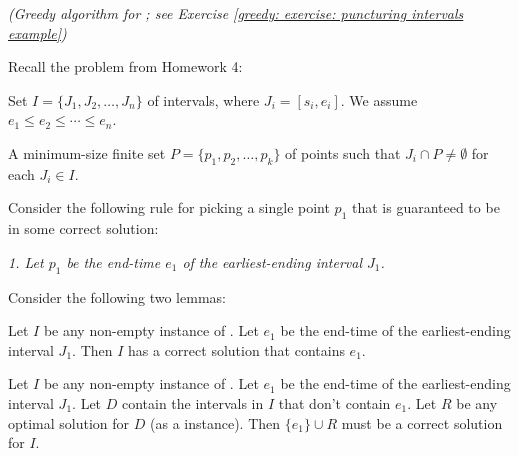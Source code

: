 \documentclass[11pt]{article}
\begin{document}






\newpage
\problem \emph{(Greedy algorithm for ; see Exercise \ref{greedy: exercise: puncturing intervals example})}

  Recall the  problem from Homework 4: 

  \begin{mylist}
  \item[\bf input:] Set $I=\{J_1, J_2, \ldots, J_n\}$ of intervals, where $J_i = [s_i, e_i]$.
    We assume $e_1 \le e_2 \le \cdots \le e_n$.
  \item[\bf output:] A minimum-size finite set $P=\{p_1, p_2, \ldots, p_k\}$
    of points such that $J_i \cap P \ne \emptyset$ for each $J_i\in I$.
  \end{mylist}

  Consider the following rule for picking a single point $p_1$ that is guaranteed to be in some
  correct solution:

  \smallskip 

  \emph{1. Let $p_1$ be the end-time $e_1$ of the earliest-ending interval $J_1$.}

  \smallskip

  Consider the following two lemmas:

  \begin{lemma}\label{lemma: pi greedy choice}
    Let $I$ be any non-empty instance of .
    Let $e_1$ be the end-time of the earliest-ending interval $J_1$.
    Then $I$ has a correct solution that contains $e_1$.
  \end{lemma}

  \begin{lemma}\label{lemma: pi recurse}
    Let $I$ be any non-empty instance of .
    Let $e_1$ be the end-time of the earliest-ending interval $J_1$.
    Let $D$ contain the intervals in $I$ that don't contain $e_1$.
    Let $R$ be any optimal solution for $D$ (as a  instance).
    Then $\{e_1\}\cup R$ must be a correct solution for $I$.
  \end{lemma}
\end{document}
